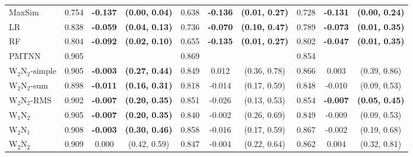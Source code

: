{\begin{landscape}
\begin{table}[htb]
\begin{tabular}{ l S S c S S c S S c }
            {} \\
    \midrule
    MaxSim & 0.754 & \bfseries \color{red} -0.137 & \bfseries \color{red} (\num{0.00}, \num{0.04}) & 0.638 & \bfseries \color{red} -0.136 & \bfseries \color{red} (\num{0.01}, \num{0.27}) & 0.728 & \bfseries \color{red} -0.131 & \bfseries \color{red} (\num{0.00}, \num{0.24}) \\
    LR & 0.838 & \bfseries \color{red} -0.059 & \bfseries \color{red} (\num{0.04}, \num{0.13}) & 0.736 & \bfseries \color{red} -0.070 & \bfseries \color{red} (\num{0.10}, \num{0.47}) & 0.789 & \bfseries \color{red} -0.073 & \bfseries \color{red} (\num{0.01}, \num{0.35}) \\
    RF & 0.804 & \bfseries \color{red} -0.092 & \bfseries \color{red} (\num{0.02}, \num{0.10}) & 0.655 & \bfseries \color{red} -0.135 & \bfseries \color{red} (\num{0.01}, \num{0.27}) & 0.802 & \bfseries \color{red} -0.047 & \bfseries \color{red} (\num{0.01}, \num{0.35}) \\
    PMTNN & 0.905 &  &  & 0.869 &  &  & 0.854 &  &  \\
    \midrule
    W$_2$N$_2$-simple & 0.905 & \bfseries \color{red} -0.003 & \bfseries \color{red} (\num{0.27}, \num{0.44}) & 0.849 & 0.012 & (\num{0.36}, \num{0.78}) & 0.866 & 0.003 & (\num{0.39}, \num{0.86}) \\
    W$_2$N$_2$-sum & 0.898 & \bfseries \color{red} -0.011 & \bfseries \color{red} (\num{0.16}, \num{0.31}) & 0.818 & -0.014 & (\num{0.17}, \num{0.59}) & 0.848 & -0.010 & (\num{0.09}, \num{0.53}) \\
    W$_2$N$_2$-RMS & 0.902 & \bfseries \color{red} -0.007 & \bfseries \color{red} (\num{0.20}, \num{0.35}) & 0.851 & -0.026 & (\num{0.13}, \num{0.53}) & 0.854 & \bfseries \color{red} -0.007 & \bfseries \color{red} (\num{0.05}, \num{0.45}) \\
    W$_1$N$_2$ & 0.905 & \bfseries \color{red} -0.007 & \bfseries \color{red} (\num{0.20}, \num{0.35}) & 0.840 & -0.002 & (\num{0.26}, \num{0.69}) & 0.849 & -0.009 & (\num{0.09}, \num{0.53}) \\
    W$_2$N$_1$ & 0.908 & \bfseries \color{red} -0.003 & \bfseries \color{red} (\num{0.30}, \num{0.46}) & 0.858 & -0.016 & (\num{0.17}, \num{0.59}) & 0.867 & -0.002 & (\num{0.19}, \num{0.68}) \\
    W$_2$N$_2$ & 0.909 & 0.000 & (\num{0.42}, \num{0.59}) & 0.847 & -0.004 & (\num{0.22}, \num{0.64}) & 0.862 & 0.004 & (\num{0.32}, \num{0.81}) \\

\end{tabular}
\end{table}
\end{landscape}}
